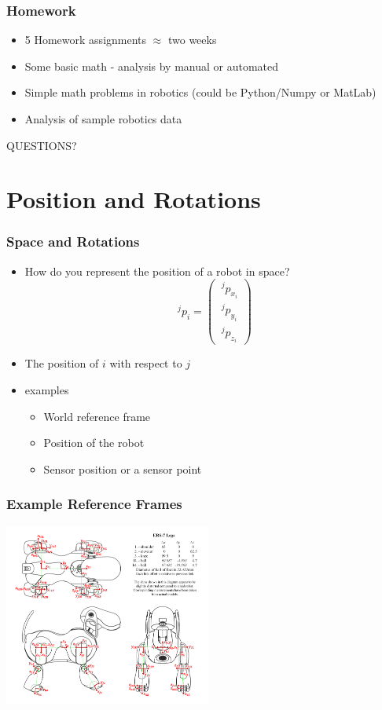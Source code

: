 \documentclass[10pt]{beamer}
\begin{document}
\begin{frame}
  \frametitle{Homework}
  \begin{itemize}
  \item 5 Homework assignments $\approx$ two weeks
  \item Some basic math - analysis by manual or automated
  \item Simple math problems in robotics (could be Python/Numpy or MatLab)
  \item Analysis of sample robotics data
  \end{itemize}
\end{frame}

\begin{frame}
  \centerline{\Huge QUESTIONS?}
\end{frame}

\section{Position and Rotations}

\begin{frame}
  \frametitle{Space and Rotations}
  \begin{itemize}
  \item How do you represent the position of a robot in space?
    \pause 
    \begin{equation*}
      ~^{j}p_{i} = \left( \begin{array}{c} ~^{j}p_{x_i} \\ ~^{j}p_{y_i} \\ ~^{j}p_{z_i}  \end{array} \right)
    \end{equation*}
  \item The position of $i$ with respect to $j$
  \item examples
    \begin{itemize}
    \item World reference frame
    \item Position of the robot
    \item Sensor position or a sensor point
    \end{itemize}
  \end{itemize}
\end{frame}

\begin{frame}
  \frametitle{Example Reference Frames}
  \centerline{\includegraphics[height=6cm]{sony-trfs}}
\end{frame}
  
\end{document}
